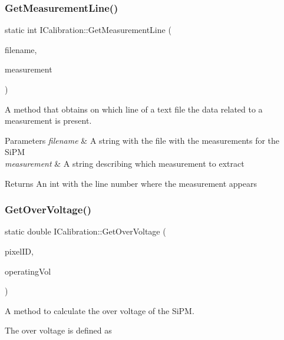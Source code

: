 \subsubsection{\texorpdfstring{Get\+Measurement\+Line()}{GetMeasurementLine()}}
{\footnotesize\ttfamily static int I\+Calibration\+::\+Get\+Measurement\+Line (\begin{DoxyParamCaption}\item[{std\+::string}]{filename,  }\item[{std\+::string}]{measurement }\end{DoxyParamCaption})\hspace{0.3cm}{\ttfamily [static]}}



A method that obtains on which line of a text file the data related to a measurement is present. 


\begin{DoxyParams}{Parameters}
{\em filename} & A string with the file with the measurements for the Si\+PM \\
\hline
{\em measurement} & A string describing which measurement to extract\\
\hline
\end{DoxyParams}
\begin{DoxyReturn}{Returns}
An int with the line number where the measurement appears 
\end{DoxyReturn}
\mbox{\label{classICalibration_abf475c05f96c8431e2a929eb330f2c1c}} 
\subsubsection{\texorpdfstring{Get\+Over\+Voltage()}{GetOverVoltage()}}
{\footnotesize\ttfamily static double I\+Calibration\+::\+Get\+Over\+Voltage (\begin{DoxyParamCaption}\item[{int}]{pixel\+ID,  }\item[{double}]{operating\+Vol }\end{DoxyParamCaption})\hspace{0.3cm}{\ttfamily [static]}}



A method to calculate the over voltage of the Si\+PM. 

The over voltage is defined as

